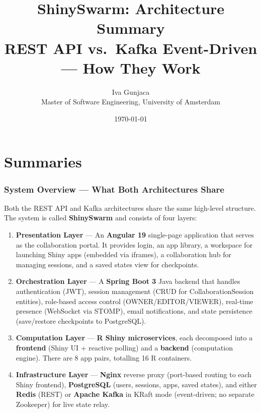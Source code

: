 \documentclass[12pt,a4paper]{article}
\title{\textbf{ShinySwarm: Architecture Summary}\\[0.5em]
\large REST API vs.\ Kafka Event-Driven --- How They Work}
\author{Iva Gunjaca\\
Master of Software Engineering, University of Amsterdam}
\date{\today}
\begin{document}
\maketitle
\tableofcontents
\newpage

\part{Summaries}

\section{System Overview --- What Both Architectures Share}

Both the REST API and Kafka architectures share the same high-level structure. The system is called \textbf{ShinySwarm} and consists of four layers:

\begin{enumerate}[nosep]
  \item \textbf{Presentation Layer} --- An \textbf{Angular 19} single-page application that serves as the collaboration portal. It provides login, an app library, a workspace for launching Shiny apps (embedded via iframes), a collaboration hub for managing sessions, and a saved states view for checkpoints.
  \item \textbf{Orchestration Layer} --- A \textbf{Spring Boot 3} Java backend that handles authentication (JWT), session management (CRUD for CollaborationSession entities), role-based access control (OWNER/EDITOR/VIEWER), real-time presence (WebSocket via STOMP), email notifications, and state persistence (save/restore checkpoints to PostgreSQL).
  \item \textbf{Computation Layer} --- \textbf{R Shiny microservices}, each decomposed into a \textbf{frontend} (Shiny UI + reactive polling) and a \textbf{backend} (computation engine). There are 8 app pairs, totalling 16 R containers.
  \item \textbf{Infrastructure Layer} --- \textbf{Nginx} reverse proxy (port-based routing to each Shiny frontend), \textbf{PostgreSQL} (users, sessions, apps, saved states), and either \textbf{Redis} (REST) or \textbf{Apache Kafka} in KRaft mode (event-driven; no separate Zookeeper) for live state relay.
\end{enumerate}
\end{document}
